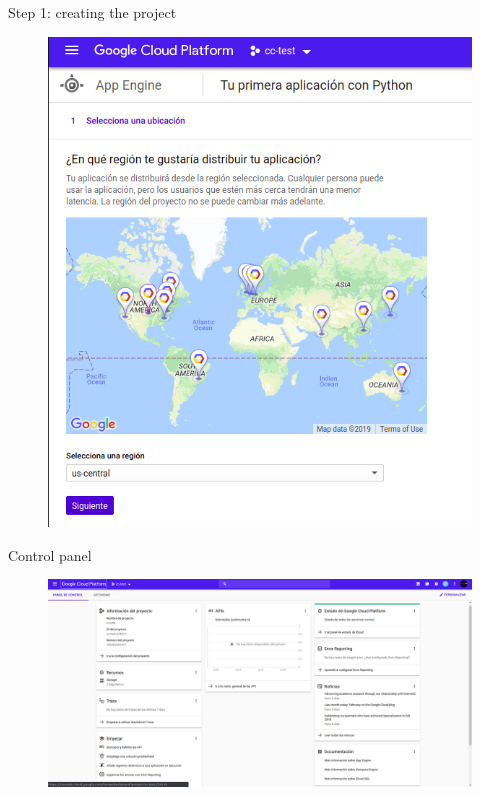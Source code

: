 \documentclass{beamer}
\begin{document}
\begin{frame}[fragile]{Step 1: creating the project}
    \begin{figure}[H]
      \centering
      \includegraphics[scale=0.4]{../img/tutorial/1select_region}
    \end{figure}
\end{frame}

\begin{frame}[fragile]{Control panel}
    \begin{figure}[H]
      \centering
      \includegraphics[scale=0.2]{../img/tutorial/2controlpanel}
    \end{figure}
\end{frame}
\end{document}
